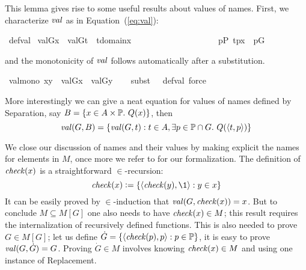 This lemma gives rise to some useful results about values of
names. First, we characterize $\operatorname{\mathit{val}}$ as in Equation~(\ref{eq:val}):
\begin{isabelle}
  \isamarkupfalse%
  \ def{\isacharunderscore}val{\isacharcolon}\isanewline
  \ {\isachardoublequoteopen}val{\isacharparenleft}G{\isacharcomma}x{\isacharparenright}\ {\isacharequal}\ {\isacharbraceleft}val{\isacharparenleft}G{\isacharcomma}t{\isacharparenright}\ {\isachardot}{\isachardot}\ t{\isasymin}domain{\isacharparenleft}x{\isacharparenright}\ {\isacharcomma}\isanewline
\ \ \ \ \ \ \ \ \ \ \ \ \ \ \ \ \ \ \ {\isasymexists}p{\isasymin}P{\isachardot}\ {\isacharless}t{\isacharcomma}p{\isachargreater}{\isasymin}x\ {\isasymand}\ p{\isasymin}G\ {\isacharbraceright}{\isachardoublequoteclose}
\end{isabelle}
and the monotonicity of $\operatorname{\mathit{val}}$ follows automatically after a
substitution.
\begin{isabelle}
\isamarkupfalse%
\ val{\isacharunderscore}mono{\isacharcolon}\ {\isachardoublequoteopen}x{\isasymsubseteq}y\ {\isasymLongrightarrow}\ val{\isacharparenleft}G{\isacharcomma}x{\isacharparenright}\ {\isasymsubseteq}\ val{\isacharparenleft}G{\isacharcomma}y{\isacharparenright}{\isachardoublequoteclose}\isanewline
%
\ \ \isamarkupfalse%
\ {\isacharparenleft}subst\ {\isacharparenleft}{}\ {}{\isacharparenright}\ def{\isacharunderscore}val{\isacharcomma}\ force{\isacharparenright}%
\end{isabelle}
More interestingly we can give a neat equation for values of
names defined by Separation, say $B = \{x\in A\times \mathbb{P}.\ Q(x)\}$,
then
\begin{equation}
\val(G,B) = \{\val(G,t) : t\in A , \exists p\in \PP \cap G.\ Q(\lb t,p\rb) \} \label{eq:val-name-sep}
\end{equation}

We close our discussion of names and their values by making explicit
the names for elements in $M$, once more we refer to
\cite{2018arXiv180705174G} for our formalization. The definition of
$\operatorname{\mathit{check}}(x)$ is a straightforward $\in$-recursion:
\begin{equation*}
  \label{eq:def-check}
  \chk(x)\defi\{\lb\chk(y),\1\rb : y\in x\}
\end{equation*}
It can be easily proved by $\in$-induction that $\operatorname{\mathit{val}}(G,\operatorname{\mathit{check}}(x))=x$.
But to conclude $M\subseteq M[G]$ one also needs to have
$\operatorname{\mathit{check}}(x) \in M$; this result requires the internalization of
recursively defined functions. This is also needed to prove
$G \in M[G]$; let us define
$\dot G= \{\langle \operatorname{\mathit{check}}(p),p\rangle : p \in \mathbb{P} \}$, it is easy to prove
$\operatorname{\mathit{val}}(G,\dot G) = G$. Proving $\dot G\in M$ involves knowing
$\operatorname{\mathit{check}}(x) \in M$ and using one instance of Replacement.

